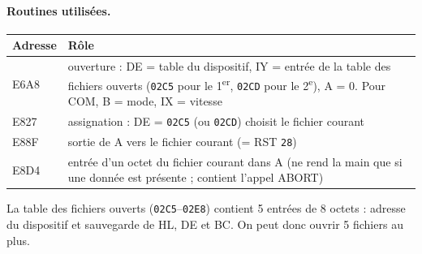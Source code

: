 \documentclass[a4paper,10pt]{article}
\newcommand{\hex}[1]{\texttt{#1}}
\begin{document}
\paragraph{Routines utilisées.}
\begin{center}\small
\begin{tabular}{@{}>{\ttfamily}l>{\raggedright\arraybackslash}p{12cm}@{}}
\toprule
\normalfont Adresse & Rôle \\
\midrule
E6A8 & ouverture : DE = table du dispositif, IY = entrée de la table des fichiers ouverts (\hex{02C5} pour le 1\textsuperscript{er}, \hex{02CD} pour le 2\textsuperscript{e}), A = 0. Pour COM, B = mode, IX = vitesse \\
E827 & assignation : DE = \hex{02C5} (ou \hex{02CD}) choisit le fichier courant \\
E88F & sortie de A vers le fichier courant (= RST \hex{28}) \\
E8D4 & entrée d'un octet du fichier courant dans A (ne rend la main que si une donnée est présente ; contient l'appel ABORT) \\
\bottomrule
\end{tabular}
\end{center}
La table des fichiers ouverts (\hex{02C5}--\hex{02E8}) contient 5 entrées de
8 octets : adresse du dispositif et sauvegarde de HL, DE et BC. On peut donc
ouvrir 5 fichiers au plus.
\end{document}
